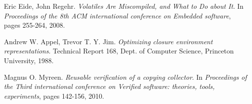 \begin{thebibliography}{99}
Eric Eide, John Regehr.
\textit{Volatiles Are Miscompiled, and What to Do about It}.
In \textit{Proceedings of the 8th ACM international conference on Embedded software}, pages 255-264, 2008.

Andrew W. Appel, Trevor T. Y. Jim.
\textit{Optimizing closure environment representations}.
Technical Report 168, Dept. of Computer Science, Princeton University, 1988.

Magnus O. Myreen.
\textit{Reusable verification of a copying collector}.
In \textit{Proceedings of the Third international conference on Verified software: theories, tools, experiments}, pages 142-156, 2010.

\end{thebibliography}
